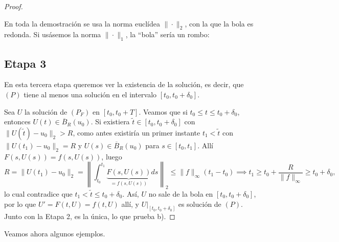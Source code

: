 \begin{proof}
    \begin{observación}
        En toda la demostración se usa la norma euclídea $\| \cdot \|_2$, con la que la bola es redonda. Si usásemos la norma $\| \cdot \|_1$, la ``bola'' sería un rombo:
        \begin{center}
        \end{center}
    \end{observación}

    \subsection*{Etapa 3}
    En esta tercera etapa queremos ver la existencia de la solución, es decir, que $(P)$ tiene al menos una solución en el intervalo $[t_0, t_0 + \delta_0]$.


    Sea $U$ la solución de $(P_F)$ en $[t_0, t_0 + T]$. Veamos que si $t_0 \leq t \leq t_0 + \delta_0$, entonces $U(t) \in \overline{B}_R(u_0)$. Si existiera $\widetilde{t} \in [t_0, t_0 + \delta_0]$ con $\| U(\widetilde{t}) - u_0 \|_2 > R$, como antes existiría un primer instante $t_1 < \widetilde{t}$ con $\| U(t_1) - u_0 \|_2 = R$ y $U(s) \in \overline{B}_R(u_0)$ para $s \in [t_0, t_1]$. Allí $F(s, U(s)) = f(s, U(s))$, luego
    \[
        R = \| U(t_1) - u_0 \|_2 =
        \left\| \int_{t_0}^{t_1} \underbrace{F(s, U(s))}_{= f(s, U(s))} ds \right\|_2 \leq
        \| f \|_\infty (t_1 - t_0)
        \implies
        t_1 \geq t_0 + \frac{R}{\| f \|_\infty} \geq t_0 + \delta_0,
    \]
    lo cual contradice que $t_1 < \widetilde{t} \leq t_0 + \delta_0$. Así, $U$ no sale de la bola en $[t_0, t_0 + \delta_0]$, por lo que $U' = F(t, U) = f(t, U)$ allí, y $U|_{[t_0, t_0 + \delta_0]}$ es solución de $(P)$. Junto con la Etapa 2, es la única, lo que prueba b).
\end{proof}

Veamos ahora algunos ejemplos.

